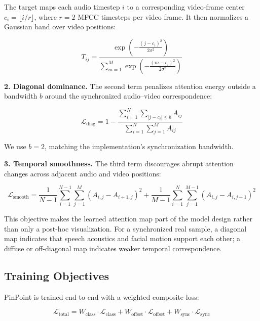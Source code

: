 \documentclass[pdflatex,sn-mathphys-num]{sn-jnl}
\begin{document}
The target maps each audio timestep $i$ to a corresponding video-frame center $c_i=\lfloor i/r\rfloor$, where $r=2$ MFCC timesteps per video frame. It then normalizes a Gaussian band over video positions:

\begin{equation}\label{eq3}
T_{ij} = \frac{\exp\!\left(-\frac{(j-c_i)^2}{2\sigma^2}\right)}
{\sum_{m=1}^{M}\exp\!\left(-\frac{(m-c_i)^2}{2\sigma^2}\right)}
\end{equation}

\textbf{2. Diagonal dominance.} The second term penalizes attention energy outside a bandwidth $b$ around the synchronized audio--video correspondence:

\begin{equation}\label{eq4}
\mathcal{L}_{\text{diag}} = 1 - \frac{\displaystyle\sum_{i=1}^{N}\sum_{|j-c_i| \le b} A_{ij}}{\displaystyle\sum_{i=1}^{N}\sum_{j=1}^{M} A_{ij}}
\end{equation}

We use $b=2$, matching the implementation's synchronization bandwidth.

\textbf{3. Temporal smoothness.} The third term discourages abrupt attention changes across adjacent audio and video positions:

\begin{equation}\label{eq5}
\mathcal{L}_{\text{smooth}} = \frac{1}{N-1} \sum_{i=1}^{N-1} \sum_{j=1}^{M} (A_{i,j} - A_{i+1,j})^2 + \frac{1}{M-1} \sum_{i=1}^{N} \sum_{j=1}^{M-1} (A_{i,j} - A_{i,j+1})^2
\end{equation}

This objective makes the learned attention map part of the model design rather than only a post-hoc visualization. For a synchronized real sample, a diagonal map indicates that speech acoustics and facial motion support each other; a diffuse or off-diagonal map indicates weaker temporal correspondence.


\subsection{Training Objectives}\label{sec3.4}

PinPoint is trained end-to-end with a weighted composite loss:

\begin{equation}\label{eq6}
\mathcal{L}_{\text{total}} = W_{\text{class}} \cdot \mathcal{L}_{\text{class}} + W_{\text{offset}} \cdot \mathcal{L}_{\text{offset}} + W_{\text{sync}} \cdot \mathcal{L}_{\text{sync}}
\end{equation}
\end{document}

